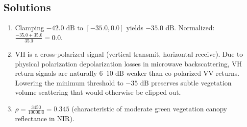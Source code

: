 \subsection*{Solutions}
\begin{enumerate}
    \item Clamping $-42.0\text{ dB}$ to $[-35.0, 0.0]$ yields $-35.0\text{ dB}$. Normalized: $\frac{-35.0 + 35.0}{35.0} = 0.0$.
    \item VH is a cross-polarized signal (vertical transmit, horizontal receive). Due to physical polarization depolarization losses in microwave backscattering, VH return signals are naturally $6\text{--}10\text{ dB}$ weaker than co-polarized VV returns. Lowering the minimum threshold to $-35\text{ dB}$ preserves subtle vegetation volume scattering that would otherwise be clipped out.
    \item $\rho = \frac{3450}{10000.0} = 0.345$ (characteristic of moderate green vegetation canopy reflectance in NIR).
\end{enumerate}
